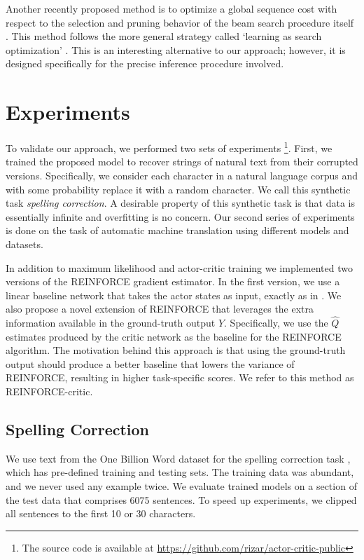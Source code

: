 \documentclass{article} %
\begin{document}
Another recently proposed method is to optimize a global sequence
cost with respect to the selection and pruning behavior of the beam search procedure itself
\citep{wiseman2016sequence}. This method follows the more general strategy
called `learning as search optimization' \citep{daume2005learning}. This is an
interesting alternative to our approach; however, it is designed
specifically for the precise inference procedure involved.


\section{Experiments}

To validate our approach, we performed two sets of experiments \footnote{
The source code is available at \url{https://github.com/rizar/actor-critic-public}}.
First, we trained
the proposed model to recover strings of natural text from their corrupted versions.
Specifically, we consider each character in a natural language corpus
and with some probability replace it with a random
character. We call this synthetic task
 \textit{spelling correction}.
A desirable property of this synthetic task
is that data is essentially infinite and overfitting is no concern. 
Our second series of experiments is done on the task of automatic machine translation
using different models and datasets.

In addition to maximum likelihood and actor-critic training we implemented two versions of
the REINFORCE gradient estimator. In the first version, we use a linear baseline network that takes
the actor states as input, exactly as in \citep{ranzato2015sequence}. 
We also propose a novel extension of REINFORCE that leverages the extra information available
in the ground-truth output $Y$. Specifically, we use the $\hat{Q}$ estimates produced by
the critic network as the baseline for the REINFORCE algorithm. The motivation behind this approach
is that using the ground-truth output should produce a better baseline that lowers
the variance of REINFORCE, resulting in higher task-specific scores. We refer
to this method as REINFORCE-critic. 
\subsection{Spelling Correction} 

We use text from the One Billion Word dataset for the spelling correction
task \citep{chelba2013one}, which has pre-defined training and testing sets.
The training data was abundant, and we never used any example twice.  We
evaluate trained models on a section of the test data that comprises 6075
sentences. To speed up experiments, we clipped all sentences to the first 10
or 30 characters.
\end{document}
